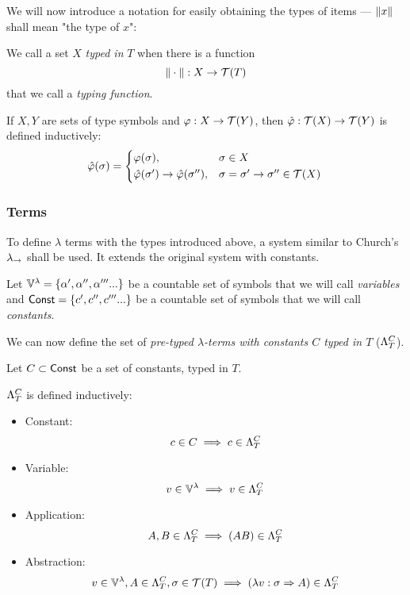 \documentclass[main.tex]{subfiles}
\begin{document}
We will now introduce a notation for easily obtaining the types of items ---
$\typeof{x}$ shall mean "the type of $x$":

\begin{defn}
    We call a set $X$ \emph{typed in} $T$ when there is a function
    \[ \typeoff : X \fun \tclos{T} \]
    that we call a \emph{typing function}.
\end{defn}

\begin{defn}
    If $X, Y$ are sets of type symbols and $\varphi: X \fun \tclos{Y}$,
    then $\hat{\varphi} : \tclos{X} \fun \tclos{Y}$ is defined inductively:
    \begin{equation*}
        \hat{\varphi}(\sigma) =
        \begin{cases*}
            \varphi(\sigma) ,& $\sigma \in X$ \\
            \hat{\varphi}(\sigma') \tot \hat{\varphi}(\sigma'') ,&
                $\sigma = \sigma' \tot \sigma'' \in \tclos{X}$ \\
        \end{cases*}
    \end{equation*}
\end{defn}

\subsubsection{Terms}
To define $\lambda$ terms with the types introduced above, a system similar
to Church's $\lambda_\tot$ \cite[chap.~2.4]{ttfp} shall be used. It
extends the original system with constants.

Let $\lvars = \{ \alpha', \alpha'', \alpha''' ... \}$ be a countable set of symbols
that we will call \emph{variables} and $\const = \{ c', c'', c''' ... \}$ be a countable
set of symbols that we will call \emph{constants}.

We can now define the set of
\emph{pre-typed $\lambda$-terms with constants $C$ typed in $T$} ($\plambda{T}{C}$).

\begin{defn}
    \label{def:lambdaterm}
    Let $C \subset \const$ be a set of constants, typed in $T$.

    $\plambda{T}{C}$ is defined inductively:
    \begin{itemize}
        \item Constant:    \[ c \in C \implies c \in \plambda{T}{C} \]
        \item Variable:    \[ v \in \lvars \implies v \in \plambda{T}{C} \]
        \item Application: \[ A, B \in \plambda{T}{C} \implies (AB) \in \plambda{T}{C} \]
        \item Abstraction: \[ v \in \lvars, A \in \plambda{T}{C}, \sigma \in \tclos{T}
                \implies (\lambda v : \sigma \abstr A) \in \plambda{T}{C} \]
    \end{itemize}
\end{defn}
\end{document}

